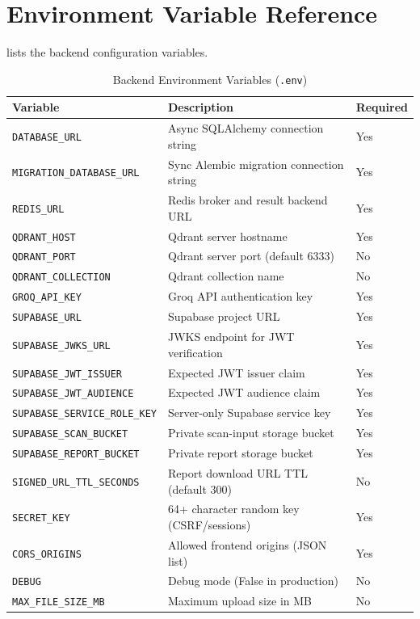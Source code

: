 \documentclass[conference]{IEEEtran}
\newcommand{\tsz}{\footnotesize}
\begin{document}
\section{Environment Variable Reference}
\label{app:env}
 lists the backend configuration variables.

\begin{table}[!t]
\caption{Backend Environment Variables (\texttt{.env})}
\label{tab:envvars}
\centering\tsz
\renewcommand{\arraystretch}{1.05}
\begin{tabularx}{\textwidth}{@{}lXl@{}}
\toprule
\textbf{Variable} & \textbf{Description} & \textbf{Required}\\
\midrule
\texttt{DATABASE\_URL}             & Async SQLAlchemy connection string & Yes\\
\texttt{MIGRATION\_DATABASE\_URL}  & Sync Alembic migration connection string & Yes\\
\texttt{REDIS\_URL}                & Redis broker and result backend URL & Yes\\
\texttt{QDRANT\_HOST}              & Qdrant server hostname & Yes\\
\texttt{QDRANT\_PORT}              & Qdrant server port (default 6333) & No\\
\texttt{QDRANT\_COLLECTION}        & Qdrant collection name & No\\
\texttt{GROQ\_API\_KEY}            & Groq API authentication key & Yes\\
\texttt{SUPABASE\_URL}             & Supabase project URL & Yes\\
\texttt{SUPABASE\_JWKS\_URL}       & JWKS endpoint for JWT verification & Yes\\
\texttt{SUPABASE\_JWT\_ISSUER}     & Expected JWT issuer claim & Yes\\
\texttt{SUPABASE\_JWT\_AUDIENCE}   & Expected JWT audience claim & Yes\\
\texttt{SUPABASE\_SERVICE\_ROLE\_KEY} & Server-only Supabase service key & Yes\\
\texttt{SUPABASE\_SCAN\_BUCKET}    & Private scan-input storage bucket & Yes\\
\texttt{SUPABASE\_REPORT\_BUCKET}  & Private report storage bucket & Yes\\
\texttt{SIGNED\_URL\_TTL\_SECONDS} & Report download URL TTL (default 300) & No\\
\texttt{SECRET\_KEY}               & 64+ character random key (CSRF/sessions) & Yes\\
\texttt{CORS\_ORIGINS}             & Allowed frontend origins (JSON list) & Yes\\
\texttt{DEBUG}                     & Debug mode (False in production) & No\\
\texttt{MAX\_FILE\_SIZE\_MB}       & Maximum upload size in MB & No\\
\bottomrule
\end{tabularx}
\end{table}
\end{document}
